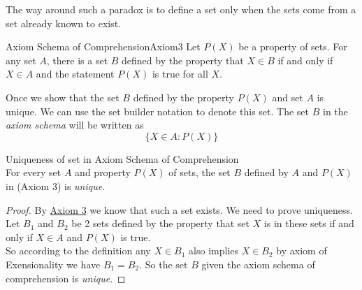\documentclass[16pt,a4paper]{article}
\theoremstyle{definition}
\begin{document}
\begin{center}
\end{center}
The way around such a paradox is to define a set only when the sets come from a set already known to exist.
 \newpage

\begin{axm}{Axiom Schema of Comprehension}{Axiom3}
\label{Axiom3}
 Let $P(X)$ be a property of sets. For any set $A$, there is a set $B$ defined by the property  that $X\in B$ if and only if $X\in A$ and the statement $P(X)$ is true for all $X$.
 \end{axm}
Once we show that the set $B$ defined by the property $P(X)$ and set $A$ is unique. We can use the set builder notation to denote this set. The set $B$ in the \textit{axiom schema } will be written as
\[\{X\in A : P(X)\}\]


\begin{thm}{Uniqueness of set in Axiom Schema of Comprehension}{}
$\;$\\
For every set $A$ and property $P(X)$ of sets, the set $B$ defined by $A$ and $P(X)$ in (Axiom 3) is \textit{unique}. 
\end{thm}
\begin{proof}
By  \hyperref[Axiom3]{Axiom 3} we know that such a set exists. We need to prove uniqueness. Let $B_1$ and $B_2$ be 2 sets defined by the property that set $X$ is in these sets if and only if $X\in A$ and $P(X)$ is true. \\
So according to the definition any $X\in B_1$ also implies $X\in B_2$ by axiom of Exensionality we have $B_1 = B_2$. So the set $B$ given the axiom schema of comprehension is \textit{unique}. 
\end{proof}
\end{document}
